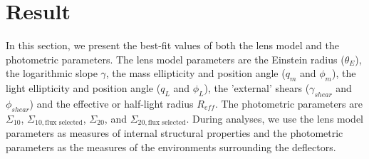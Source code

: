 \documentclass{aa}
\begin{document}
\section{Result} \label{sec:result}
In this section, we present the best-fit values of both the lens model and the photometric parameters. The lens model parameters are the Einstein radius ($\theta_{E}$), the logarithmic slope $\gamma$, the mass ellipticity and position angle ($q_{m}$ and $\phi_{m}$), the light ellipticity and position angle ($q_{L}$ and $\phi_{L}$), the 'external' shears ($\gamma_{shear}$ and $\phi_{shear}$) and the effective or half-light radius $R_{eff}$. 
The photometric parameters are $\Sigma_{10}$, $\Sigma_{10, \text{flux selected}}$, $\Sigma_{20}$, and $\Sigma_{20, \text{flux selected}}$.
During analyses, we use the lens model parameters as measures of internal structural properties and the photometric parameters as the measures of the environments surrounding the deflectors.
\end{document}
